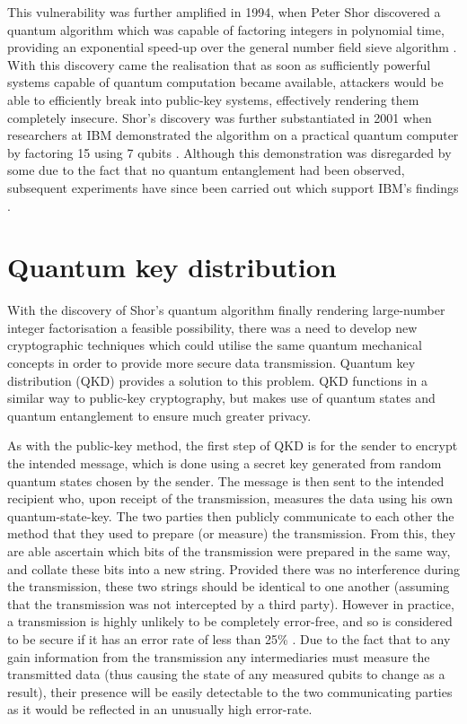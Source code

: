 \documentclass[runningheads,a4paper]{llncs}
\begin{document}
This vulnerability was further amplified in 1994, when Peter Shor discovered a quantum algorithm which was capable of factoring integers in polynomial time, providing an exponential speed-up over the general number field sieve algorithm \cite{Shor:1994fk}. With this discovery came the realisation that as soon as sufficiently powerful systems capable of quantum computation became available, attackers would be able to efficiently break into public-key systems, effectively rendering them completely insecure. Shor's discovery was further substantiated in 2001 when researchers at IBM demonstrated the algorithm on a practical quantum computer by factoring 15 using 7 qubits \cite{Vandersypen:2001fk}. Although this demonstration was disregarded by some due to the fact that no quantum entanglement had been observed, subsequent experiments have since been carried out which support IBM's findings \cite{Lu:2007uq}.

\section{Quantum key distribution}

With the discovery of Shor's quantum algorithm finally rendering large-number integer factorisation a feasible possibility, there was a need to develop new cryptographic techniques which could utilise the same quantum mechanical concepts in order to provide more secure data transmission. Quantum key distribution (QKD) provides a solution to this problem. QKD functions in a similar way to public-key cryptography, but makes use of quantum states and quantum entanglement to ensure much greater privacy.

As with the public-key method, the first step of QKD is for the sender to encrypt the intended message, which is done using a secret key generated from random quantum states chosen by the sender. The message is then sent to the intended recipient who, upon receipt of the transmission, measures the data using his own quantum-state-key. The two parties then publicly communicate to each other the method that they used to prepare (or measure) the transmission. From this, they are able ascertain which bits of the transmission were prepared in the same way, and collate these bits into a new string. Provided there was no interference during the transmission, these two strings should be identical to one another (assuming that the transmission was not intercepted by a third party). However in practice, a transmission is highly unlikely to be completely error-free, and so is considered to be secure if it has an error rate of less than 25\% \cite{Steane:1997zr}. Due to the fact that to any gain information from the transmission any intermediaries must measure the transmitted data (thus causing the state of any measured qubits to change as a result),  their presence will be easily detectable to the two communicating parties as it would be reflected in an unusually high error-rate.
\end{document}

